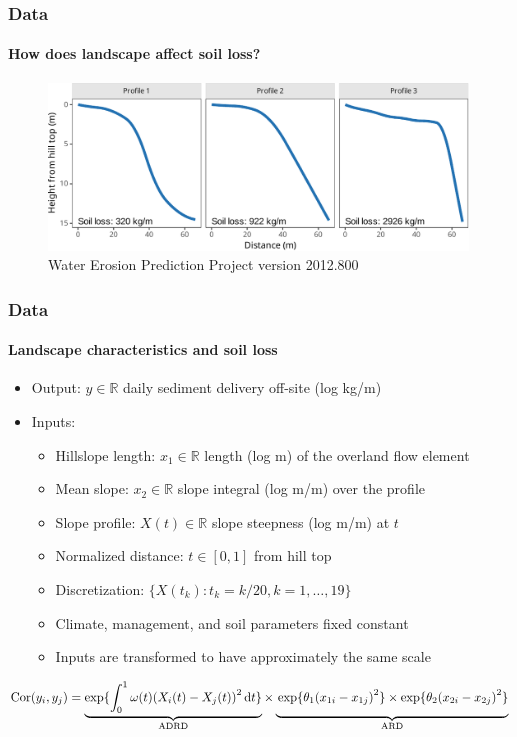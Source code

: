 \documentclass{snedecorbeamer}
\begin{document}
\begin{frame}
  \frametitle{Data}
  \framesubtitle{How does landscape affect soil loss?}

  \begin{figure}
    \centering
    \includegraphics[height=12em]{inc/wepp_elevation_profiles}
    \caption*{
          \href{https://www.ars.usda.gov/midwest-area/west-lafayette-in/national-soil-erosion-research/docs/wepp/}{}
      Water Erosion Prediction Project version 2012.800
    }
  \end{figure}

\end{frame}

\begin{frame}
  \frametitle{Data}
  \framesubtitle{Landscape characteristics and soil loss}

  \begin{itemize}
  \item Output: $y\in\mathbb{R}$ daily sediment delivery off-site (log kg/m)
  \item Inputs:
    \begin{itemize}
    \item Hillslope length: $x_1\in\mathbb{R}$ length (log m) of the overland flow
      element
    \item Mean slope: $x_2\in\mathbb{R}$ slope integral (log m/m) over the profile
    \item Slope profile: $X(t)\in\mathbb{R}$ slope steepness (log m/m) at $t$
    \item Normalized distance: $t\in[0, 1]$ from hill top
    \item Discretization: $\{X(t_k) : t_k = k / 20, k = 1, \dots, 19\}$
    \item Climate, management, and soil parameters fixed constant
    \item Inputs are transformed to have approximately the same scale
    \end{itemize}
  \end{itemize}

  \vfill

  $\mathrm{Cor}(y_i, y_j) =
  \underbrace{\exp\{
    \int_0^1
    \omega(t){(X_i(t) - X_j(t))}^2\,\mathrm{d}t\}
  }_{\mathrm{ADRD}}
  \times
  \underbrace{
    \vphantom{\int_0^1}
      \exp\{\theta_1 {(x_{1i} - x_{1j})}^2\}
  \times
  \exp\{\theta_2 {(x_{2i} - x_{2j})}^2\}
  }_{\mathrm{ARD}}$
\end{frame}
\end{document}
